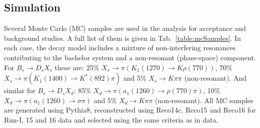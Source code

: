 \clearpage
\subsection{Simulation}
\label{sec:Sim}

Several Monte Carlo (MC) samples are used in the analysis for acceptance and
background studies.
A full list of them is given in Tab.~\ref{table:mcSamples}.
In each case, the decay model includes a mixture of non-interfering resonances contributing to the bachelor system and a non-resonant (phase-space) component.
For $B_s \to D_s X_s$ these are:
25\% $X_s \to \pi ( K_1(1270) \to K \rho(770) )$, 
70\% $X_s \to \pi ( K_1(1400) \to K^*(892) \pi)$
and 5\% $X_s \to K \pi \pi$ (non-resonant).
And similar for $B_s \to D_s X_d$:
85\% $X_d \to \pi ( a_1(1260) \to \rho(770) \pi )$, 
10\% $X_d \to \pi ( a_1(1260) \to \sigma \pi)$
and 5\% $X_d \to K \pi \pi$ (non-resonant).
All MC samples are generated using \textsf{Pythia8}, reconstructed using
\textsf{Reco14c}, \textsf{Reco15} and \textsf{Reco16} for Run-I, 15 and 16 data and
selected using the same criteria as in data.

